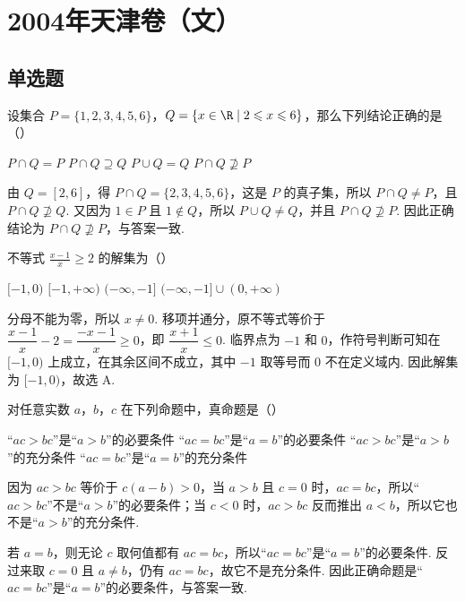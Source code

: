 \chapter{2004年天津卷（文）}
\section{单选题}
\begin{problem}
设集合 \(P = \{1, 2, 3, 4, 5, 6\}\)，\(Q = \{x \in \R \mid 2 \leqslant x \leqslant 6\}\)，那么下列结论正确的是（\quad）

\choices
    {\(P\cap Q = P\)}
    {\(P\cap Q\supseteq Q\)}
    {\(P\cup Q = Q\)}
    {\(P\cap Q\nsupseteq P\)}
\begin{solution}
由 \(Q=\left[2,6\right]\)，得
\(P\cap Q=\{2,3,4,5,6\}\)，这是 \(P\) 的真子集，所以 \(P\cap Q\ne P\)，且 \(P\cap Q\nsupseteq Q\). 又因为 \(1\in P\) 且 \(1\notin Q\)，所以 \(P\cup Q\ne Q\)，并且 \(P\cap Q\nsupseteq P\). 因此正确结论为 \(P\cap Q\nsupseteq P\)，与答案一致.
\end{solution}
\end{problem}

\begin{problem}
不等式 \(\frac{x - 1}{x} \geqslant 2\) 的解集为（\quad）

\choices
    {\([-1,0)\)}
    {\([-1, +\infty)\)}
    {\((-\infty, -1]\)}
    {\((-\infty, -1] \cup (0, +\infty)\)}
\begin{solution}
分母不能为零，所以 \(x\ne0\). 移项并通分，原不等式等价于
\(\dfrac{x-1}{x}-2=\dfrac{-x-1}{x}\geqslant0\)，即 \(\dfrac{x+1}{x}\leqslant0\). 临界点为 \(-1\) 和 \(0\)，作符号判断可知在 \([-1,0)\) 上成立，在其余区间不成立，其中 \(-1\) 取等号而 \(0\) 不在定义域内. 因此解集为 \([-1,0)\)，故选 A.
\end{solution}
\end{problem}

\begin{problem}
对任意实数 \(a\)，\(b\)，\(c\) 在下列命题中，真命题是（\quad）

\choices
    {“\(ac > bc\)”是“\(a > b\)”的必要条件}
    {“\(ac = bc\)”是“\(a = b\)”的必要条件}
    {“\(ac > bc\)”是“\(a > b\)”的充分条件}
    {“\(ac = bc\)”是“\(a = b\)”的充分条件}
\begin{solution}
因为 \(ac>bc\) 等价于 \(c(a-b)>0\)，当 \(a>b\) 且 \(c=0\) 时，\(ac=bc\)，所以“\(ac>bc\)”不是“\(a>b\)”的必要条件；当 \(c<0\) 时，\(ac>bc\) 反而推出 \(a<b\)，所以它也不是“\(a>b\)”的充分条件.

若 \(a=b\)，则无论 \(c\) 取何值都有 \(ac=bc\)，所以“\(ac=bc\)”是“\(a=b\)”的必要条件. 反过来取 \(c=0\) 且 \(a\ne b\)，仍有 \(ac=bc\)，故它不是充分条件. 因此正确命题是“\(ac=bc\)”是“\(a=b\)”的必要条件，与答案一致.
\end{solution}
\end{problem}

